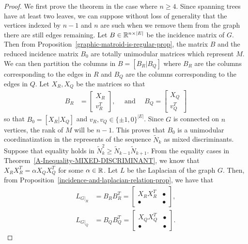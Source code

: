\documentclass{puthesis-UG}
\begin{document}
\begin{proof}
	We first prove the theorem in the case where $n \geq 4$. Since spanning trees have at least two leaves, we can suppose without loss of generality that the vertices indexed by $n-1$ and $n$ are such when we remove them from the graph there are still edges remaining. Let $B \in \mathbb{R}^{n \times |E|}$ be the incidence matrix of $G$. Then from Proposition~\ref{graphic-matroid-is-regular-prop}, the matrix $B$ and the reduced incidence matrix $B_0$ are totally unimodular matrices which represent $M$. We can then partition the columns in $B = [B_R | B_Q]$ where $B_R$ are the columns corresponding to the edges in $R$ and $B_Q$ are the columns corresponding to the edges in $Q$. Let $X_R, X_Q$ be the matrices so that 
	\begin{align*}
		B_R & = \begin{bmatrix} X_R \\ v_R^T \end{bmatrix}, \quad \text{ and } \quad B_Q = \begin{bmatrix} X_Q \\ v_Q^T \end{bmatrix}
	\end{align*}
	so that $B_0 = [X_R | X_Q]$ and $v_R, v_Q \in \{\pm 1, 0\}^{|E|}$. Since $G$ is connected on $n$ vertices, the rank of $M$ will be $n-1$. This proves that $B_0$ is a unimodular coordinatization in the represents of the sequence $\widetilde{N}_k$ as mixed discriminants. Suppose that equality holds in $\widetilde{N}_k^2 \geq \widetilde{N}_{k-1} \widetilde{N}_{k+1}$. From the equality cases in Theorem~\ref{A-Inequality-MIXED-DISCRIMINANT}, we know that $X_R X_R^T = \alpha X_Q X_Q^T$ for some $\alpha \in \mathbb{R}$. Let $L$ be the Laplacian of the graph $G$. Then, from Proposition~\ref{incidence-and-laplacian-relation-prop}, we have that
	\begin{align*}
		L_{G|_R} & = B_R B_R^T = \begin{bmatrix}
			X_RX_R^T & \bullet \\ \bullet & \bullet
		\end{bmatrix}, \\
		L_{G|_Q} & = B_Q B_Q^T = \begin{bmatrix}
			X_Q X_Q^T & \bullet \\ \bullet & \bullet
		\end{bmatrix}.
	\end{align*}

\end{proof}
\end{document}
